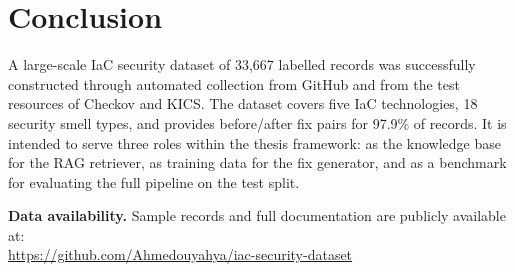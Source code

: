 \documentclass[11pt,a4paper]{article}
\begin{document}
\section{Conclusion}

A large-scale IaC security dataset of 33,667 labelled records was successfully constructed through automated collection from GitHub and from the test resources of Checkov and KICS. The dataset covers five IaC technologies, 18 security smell types, and provides before/after fix pairs for 97.9\% of records. It is intended to serve three roles within the thesis framework: as the knowledge base for the RAG retriever, as training data for the fix generator, and as a benchmark for evaluating the full pipeline on the test split.

\medskip
\noindent\textbf{Data availability.} Sample records and full documentation are publicly available at:\\
\url{https://github.com/Ahmedouyahya/iac-security-dataset}
\end{document}

